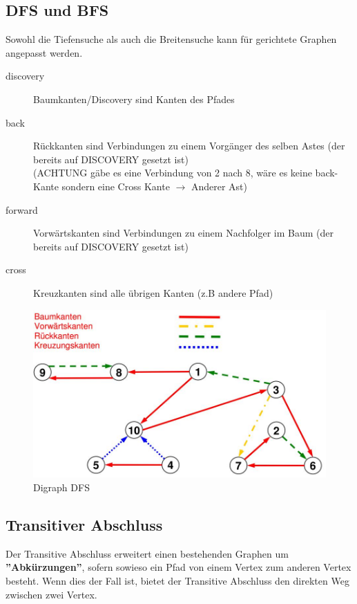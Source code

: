 \subsection{DFS und BFS}
Sowohl die Tiefensuche als auch die Breitensuche kann für gerichtete Graphen angepasst werden.
\begin{description}
	\item[discovery] Baumkanten/Discovery sind Kanten des Pfades
	\item[back] Rückkanten sind Verbindungen zu einem Vorgänger des selben Astes (der bereits auf DISCOVERY gesetzt ist) \\
	(ACHTUNG gäbe es eine Verbindung von 2 nach 8, wäre es keine back-Kante sondern eine Cross Kante $\rightarrow$ Anderer Ast)
	\item[forward] Vorwärtskanten sind Verbindungen zu einem Nachfolger im Baum (der bereits auf DISCOVERY gesetzt ist)
	\item[cross] Kreuzkanten sind alle übrigen Kanten (z.B andere Pfad)
\end{description}

\begin{figure}[h]
\centering
\includegraphics[width=\linewidth]{images/digraph_dfs}
\caption{Digraph DFS}
\label{fig:digraphdfs}
\end{figure}

\clearpage

\subsection{Transitiver Abschluss}
Der Transitive Abschluss erweitert einen bestehenden Graphen um \textbf{''Abkürzungen''}, sofern sowieso ein Pfad von einem Vertex zum anderen Vertex besteht. Wenn dies der Fall ist, bietet der Transitive Abschluss den direkten Weg zwischen zwei Vertex. 

